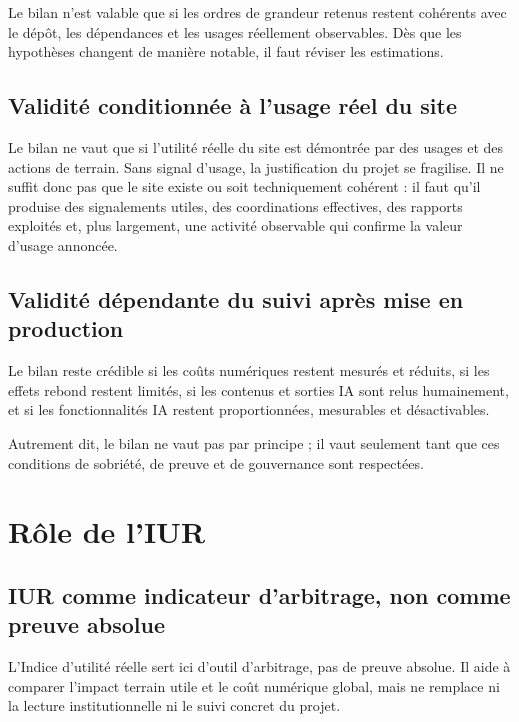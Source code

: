 \documentclass[
  10pt,
  a4paper,
  DIV=11,
  numbers=noendperiod,
  oneside]{scrreprt}
\begin{document}
Le bilan n'est valable que si les ordres de grandeur retenus restent
cohérents avec le dépôt, les dépendances et les usages réellement
observables. Dès que les hypothèses changent de manière notable, il faut
réviser les estimations.

\subsection{Validité conditionnée à l'usage réel du
site}\label{validituxe9-conditionnuxe9e-uxe0-lusage-ruxe9el-du-site}

Le bilan ne vaut que si l'utilité réelle du site est démontrée par des
usages et des actions de terrain. Sans signal d'usage, la justification
du projet se fragilise. Il ne suffit donc pas que le site existe ou soit
techniquement cohérent : il faut qu'il produise des signalements utiles,
des coordinations effectives, des rapports exploités et, plus largement,
une activité observable qui confirme la valeur d'usage annoncée.

\subsection{Validité dépendante du suivi après mise en
production}\label{validituxe9-duxe9pendante-du-suivi-apruxe8s-mise-en-production}

Le bilan reste crédible si les coûts numériques restent mesurés et
réduits, si les effets rebond restent limités, si les contenus et
sorties IA sont relus humainement, et si les fonctionnalités IA restent
proportionnées, mesurables et désactivables.

Autrement dit, le bilan ne vaut pas par principe ; il vaut seulement
tant que ces conditions de sobriété, de preuve et de gouvernance sont
respectées.

\section{Rôle de l'IUR}\label{ruxf4le-de-liur}

\subsection{IUR comme indicateur d'arbitrage, non comme preuve
absolue}\label{iur-comme-indicateur-darbitrage-non-comme-preuve-absolue}

L'Indice d'utilité réelle sert ici d'outil d'arbitrage, pas de preuve
absolue. Il aide à comparer l'impact terrain utile et le coût numérique
global, mais ne remplace ni la lecture institutionnelle ni le suivi
concret du projet.
\end{document}
